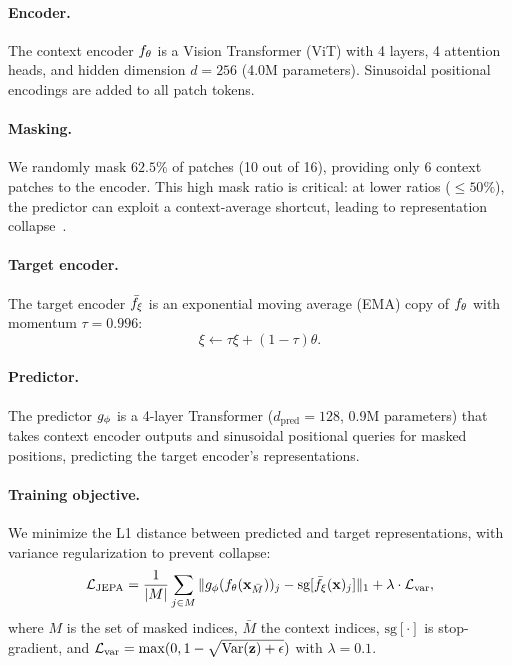 \paragraph{Encoder.} The context encoder $f_\theta$ is a Vision Transformer (ViT) with 4 layers, 4 attention heads, and hidden dimension $d = 256$ (4.0M parameters). Sinusoidal positional encodings are added to all patch tokens.

\paragraph{Masking.} We randomly mask $62.5\%$ of patches (10 out of 16), providing only 6 context patches to the encoder. This high mask ratio is critical: at lower ratios ($\leq 50\%$), the predictor can exploit a context-average shortcut, leading to representation collapse~\citep{assran2023ijepa, bardes2024vjepa}.

\paragraph{Target encoder.} The target encoder $\bar{f}_\xi$ is an exponential moving average (EMA) copy of $f_\theta$ with momentum $\tau = 0.996$:
\begin{equation}
  \xi \leftarrow \tau \xi + (1 - \tau) \theta.
  \label{eq:ema}
\end{equation}

\paragraph{Predictor.} The predictor $g_\phi$ is a 4-layer Transformer ($d_{\text{pred}} = 128$, 0.9M parameters) that takes context encoder outputs and sinusoidal positional queries for masked positions, predicting the target encoder's representations.

\paragraph{Training objective.} We minimize the L1 distance between predicted and target representations, with variance regularization to prevent collapse:
\begin{equation}
  \mathcal{L}_{\text{JEPA}} = \frac{1}{|M|} \sum_{j \in M} \| g_\phi(f_\theta(\mathbf{x}_{\bar{M}}))_j - \text{sg}[\bar{f}_\xi(\mathbf{x})_j] \|_1 + \lambda \cdot \mathcal{L}_{\text{var}},
  \label{eq:jepa_loss}
\end{equation}
where $M$ is the set of masked indices, $\bar{M}$ the context indices, $\text{sg}[\cdot]$ is stop-gradient, and $\mathcal{L}_{\text{var}} = \max(0, 1 - \sqrt{\operatorname{Var}(\mathbf{z}) + \epsilon})$ with $\lambda = 0.1$.

